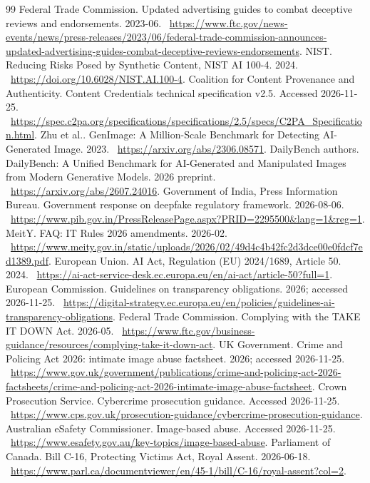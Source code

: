 \documentclass[10pt,a4paper]{article}
\begin{document}
\begin{thebibliography}{99}
 Federal Trade Commission. Updated advertising guides to combat deceptive reviews and endorsements. 2023-06. \ \url{https://www.ftc.gov/news-events/news/press-releases/2023/06/federal-trade-commission-announces-updated-advertising-guides-combat-deceptive-reviews-endorsements}.
 NIST. Reducing Risks Posed by Synthetic Content, NIST AI 100-4. 2024. \ \url{https://doi.org/10.6028/NIST.AI.100-4}.
 Coalition for Content Provenance and Authenticity. Content Credentials technical specification v2.5. Accessed 2026-11-25. \ \url{https://spec.c2pa.org/specifications/specifications/2.5/specs/C2PA_Specification.html}.
 Zhu et al.. GenImage: A Million-Scale Benchmark for Detecting AI-Generated Image. 2023. \ \url{https://arxiv.org/abs/2306.08571}.
 DailyBench authors. DailyBench: A Unified Benchmark for AI-Generated and Manipulated Images from Modern Generative Models. 2026 preprint. \ \url{https://arxiv.org/abs/2607.24016}.
 Government of India, Press Information Bureau. Government response on deepfake regulatory framework. 2026-08-06. \ \url{https://www.pib.gov.in/PressReleasePage.aspx?PRID=2295500&lang=1&reg=1}.
 MeitY. FAQ: IT Rules 2026 amendments. 2026-02. \ \url{https://www.meity.gov.in/static/uploads/2026/02/49d4c4b42fc2d3dce00e0fdcf7ed1389.pdf}.
 European Union. AI Act, Regulation (EU) 2024/1689, Article 50. 2024. \ \url{https://ai-act-service-desk.ec.europa.eu/en/ai-act/article-50?full=1}.
 European Commission. Guidelines on transparency obligations. 2026; accessed 2026-11-25. \ \url{https://digital-strategy.ec.europa.eu/en/policies/guidelines-ai-transparency-obligations}.
 Federal Trade Commission. Complying with the TAKE IT DOWN Act. 2026-05. \ \url{https://www.ftc.gov/business-guidance/resources/complying-take-it-down-act}.
 UK Government. Crime and Policing Act 2026: intimate image abuse factsheet. 2026; accessed 2026-11-25. \ \url{https://www.gov.uk/government/publications/crime-and-policing-act-2026-factsheets/crime-and-policing-act-2026-intimate-image-abuse-factsheet}.
 Crown Prosecution Service. Cybercrime prosecution guidance. Accessed 2026-11-25. \ \url{https://www.cps.gov.uk/prosecution-guidance/cybercrime-prosecution-guidance}.
 Australian eSafety Commissioner. Image-based abuse. Accessed 2026-11-25. \ \url{https://www.esafety.gov.au/key-topics/image-based-abuse}.
 Parliament of Canada. Bill C-16, Protecting Victims Act, Royal Assent. 2026-06-18. \ \url{https://www.parl.ca/documentviewer/en/45-1/bill/C-16/royal-assent?col=2}.

\end{thebibliography}
\end{document}
